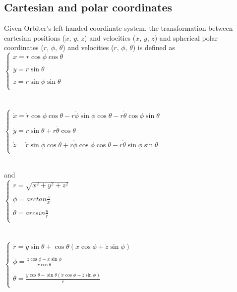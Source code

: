 \documentclass[Orbiter Technical Reference.tex]{subfiles}
\begin{document}
\noindent

\subsection{Cartesian and polar coordinates}
Given Orbiter's left-handed coordinate system, the transformation between cartesian positions ($x$, $y$, $z$) and velocities ($\dot{x}$, $\dot{y}$, $\dot{z}$) and spherical polar coordinates ($r$, $\phi$, $\theta$) and velocities ($\dot{r}$, $\dot{\phi}$, $\dot{\theta}$) is defined as\\

$
\left\{
\begin{array}{l}
x = r \cos\phi \cos\theta \\\\
y = r \sin\theta \\\\
z = r \sin\phi \sin\theta \\
\end{array} 
\right .
$
\\
\\
\\
\indent
$
\left\{
\begin{array}{l}
\dot{x} = \dot{r} \cos\phi \cos\theta - r \dot{\phi} \sin\phi\cos\theta - r \dot{\theta} \cos\phi\sin\theta \\\\
\dot{y} = \dot{r} \sin\theta + r \dot{\theta} \cos\theta \\\\
\dot{z} = \dot{r} \sin\phi \cos\theta + r \dot{\phi} \cos\phi\cos\theta - r \dot{\theta} \sin\phi\sin\theta \\
\end{array} 
\right .
$


\noindent
\\
and\\

$
\left\{
\begin{array}{l}
r = \sqrt{ x^{2} + y^{2} + z^{2} } \\\\
\phi = arctan \frac{z}{x} \\\\
\theta = arcsin \frac{y}{r} \\
\end{array} 
\right .
$
\\
\\
\\
\indent
$
\left\{
\begin{array}{l}
\dot{r} = \dot{y} \sin\theta + \cos\theta(\dot{x} \cos\phi + \dot{z} \sin\phi) \\\\
\dot{\phi} = \frac{\dot{z} \cos\phi - \dot{x} \sin\phi}{r \cos\theta} \\\\
\dot{\theta} = \frac{\dot{y} \cos\theta - \sin\theta(\dot{x} \cos\phi + \dot{z} \sin\phi)}{r} \\
\end{array} 
\right .
$
\end{document}
